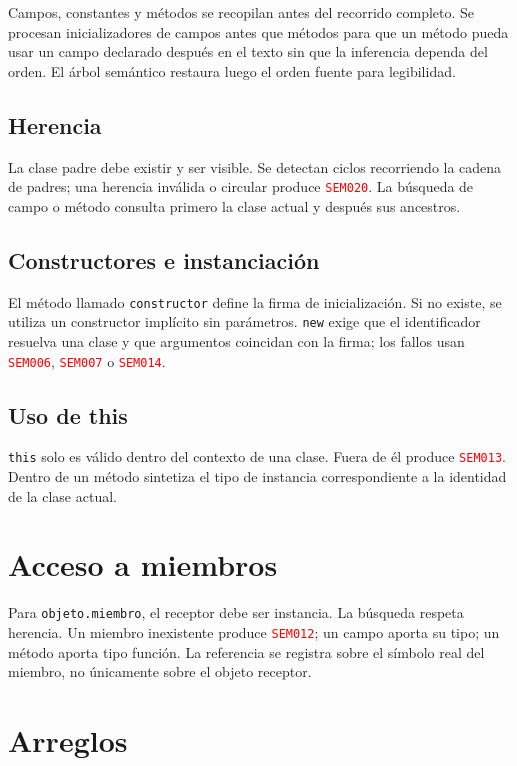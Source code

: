 \documentclass[11pt,letterpaper,oneside]{report}
\newcommand{\codigo}[1]{\texttt{#1}}
\newcommand{\diag}[1]{\textcolor{red}{\texttt{#1}}}
\begin{document}
Campos, constantes y métodos se recopilan antes del recorrido completo. Se procesan
inicializadores de campos antes que métodos para que un método pueda usar un campo
declarado después en el texto sin que la inferencia dependa del orden. El árbol
semántico restaura luego el orden fuente para legibilidad.

\subsection{Herencia}

La clase padre debe existir y ser visible. Se detectan ciclos recorriendo la cadena de
padres; una herencia inválida o circular produce \diag{SEM020}. La búsqueda de campo o
método consulta primero la clase actual y después sus ancestros.

\subsection{Constructores e instanciación}

El método llamado \codigo{constructor} define la firma de inicialización. Si no
existe, se utiliza un constructor implícito sin parámetros. \codigo{new} exige que el
identificador resuelva una clase y que argumentos coincidan con la firma; los fallos
usan \diag{SEM006}, \diag{SEM007} o \diag{SEM014}.

\subsection{Uso de this}

\codigo{this} solo es válido dentro del contexto de una clase. Fuera de él produce
\diag{SEM013}. Dentro de un método sintetiza el tipo de instancia correspondiente a
la identidad de la clase actual.

\section{Acceso a miembros}

Para \codigo{objeto.miembro}, el receptor debe ser instancia. La búsqueda respeta
herencia. Un miembro inexistente produce \diag{SEM012}; un campo aporta su tipo; un
método aporta tipo función. La referencia se registra sobre el símbolo real del
miembro, no únicamente sobre el objeto receptor.

\section{Arreglos}
\end{document}
